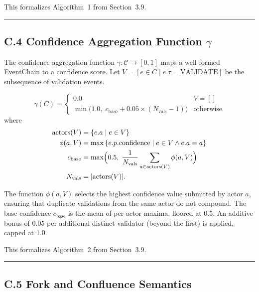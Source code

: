 This formalizes Algorithm~1 from Section~3.9.

\begin{center}\rule{0.5\linewidth}{0.5pt}\end{center}


\subsection{C.4 Confidence Aggregation Function $\gamma$}\label{c.4-confidence-aggregation-function-gamma}

The confidence aggregation function $\gamma : \mathcal{C} \to [0, 1]$ maps a well-formed EventChain to a confidence score. Let $V = [e \in C \mid e.\tau = \text{VALIDATE}]$ be the subsequence of validation events.

\begin{equation}
\gamma(C) =
  \begin{cases}
  0.0 & V = [] \\
  \min\bigl(1.0,\; c_{\text{base}} + 0.05 \times (N_{\text{vals}} - 1)\bigr) & \text{otherwise}
  \end{cases}
\end{equation}
where
\begin{align}
\text{actors}(V) &= \{e.a \mid e \in V\} \\
\phi(a, V) &= \max\, \{e.p.\text{confidence} \mid e \in V \land e.a = a\} \\
c_{\text{base}} &= \max\Bigl(0.5,\; \frac{1}{N_{\text{vals}}} \sum_{a \in \text{actors}(V)} \phi(a, V)\Bigr) \\
N_{\text{vals}} &= |\text{actors}(V)|.
\end{align}

The function $\phi(a, V)$ selects the highest confidence value submitted by actor $a$, ensuring that duplicate validations from the same actor do not compound. The base confidence $c_{\text{base}}$ is the mean of per-actor maxima, floored at 0.5. An additive bonus of $0.05$ per additional distinct validator (beyond the first) is applied, capped at 1.0.

This formalizes Algorithm~2 from Section~3.9.

\begin{center}\rule{0.5\linewidth}{0.5pt}\end{center}


\subsection{C.5 Fork and Confluence Semantics}\label{c.5-fork-and-confluence-semantics}

